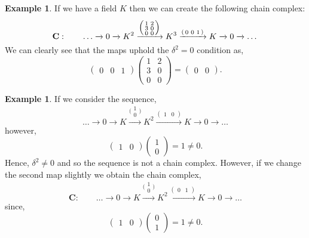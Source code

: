 \documentclass[11.5pt, twoside, a4paper, titlepage]{report}
\providecommand{\equ}[0]{\begin{equation*}}
\providecommand{\eequ}[0] {\end{equation*}}
\theoremstyle{definition}
\newtheorem{eg}[mydef]{Example}
\theoremstyle{plain}
\begin{document}
\begin{eg}
If we have a field $K$ then we can create the following chain complex:
\begin{equation*}
\mathbf{C}: \qquad \dots \xrightarrow{} 0 \xrightarrow{} K^2 \xrightarrow{\Bigl(\begin{smallmatrix}1&2\\ 3&0\\ 0&0 \end{smallmatrix}\Bigr)} K^3 \xrightarrow{(\begin{smallmatrix}0 & 0 &1\end{smallmatrix})} K \xrightarrow{} 0 \xrightarrow{}\dots
\end{equation*}
We can clearly see that the maps uphold the $\delta^2=0$ condition as,
\begin{equation*}
\begin{pmatrix}0 & 0 &1
\end{pmatrix}
\begin{pmatrix}
1 & 2 \\
3 & 0\\
0 & 0
\end{pmatrix}
=\begin{pmatrix}
0 & 0
\end{pmatrix}.
\end{equation*}
\end{eg}

\begin{eg} \label{Kchaineg}
If we consider the sequence, 
\equ 
\dots \xrightarrow{} 0 \xrightarrow{} K \xrightarrow{\big(\begin{smallmatrix} 1\\ 0 \end{smallmatrix}\big)} K^2 \xrightarrow{(\begin{smallmatrix}1 & 0 \end{smallmatrix})} K \xrightarrow{} 0 \xrightarrow{} \dots
\eequ
however,
\equ
\begin{pmatrix}
1 & 0
\end{pmatrix}
\begin{pmatrix*}
1\\
0
\end{pmatrix*}
= 1 \neq 0.
\eequ
Hence, $\delta^2 \neq0$ and so the sequence is not a chain complex. However, if we change the second map slightly we obtain the chain complex,
\equ
\mathbf{C}: \qquad \dots \xrightarrow{} 0 \xrightarrow{} K \xrightarrow{\big(\begin{smallmatrix} 1\\ 0 \end{smallmatrix}\big)} K^2 \xrightarrow{(\begin{smallmatrix}0 & 1 \end{smallmatrix})} K \xrightarrow{} 0 \xrightarrow{} \dots
\eequ
since, 
\equ
\begin{pmatrix}
1 & 0
\end{pmatrix}
\begin{pmatrix*}
0\\
1
\end{pmatrix*}
= 1 \neq 0.
\eequ
\end{eg}
\end{document}
